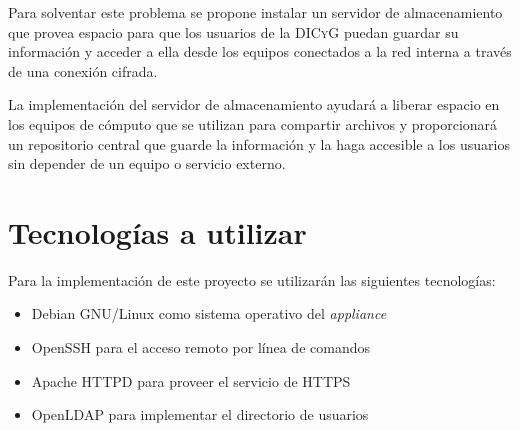 Para solventar este problema se propone instalar un servidor de almacenamiento que provea espacio para que los usuarios de la \textsc{DICyG} puedan guardar su informaci\'{o}n y acceder a ella desde los equipos conectados a la red interna a trav\'{e}s de una conexi\'{o}n cifrada.

La implementaci\'{o}n del servidor de almacenamiento ayudar\'{a} a liberar espacio en los equipos de c\'{o}mputo que se utilizan para compartir archivos y proporcionar\'{a} un repositorio central que guarde la informaci\'{o}n y la haga accesible a los usuarios sin depender de un equipo o servicio externo.


    \section {Tecnolog\'{i}as a utilizar}

Para la implementaci\'{o}n de este proyecto se utilizar\'{a}n las siguientes tecnolog\'{i}as:

\begin{itemize}
  \item Debian GNU/Linux como sistema operativo del \textit{appliance}
  \item OpenSSH para el acceso remoto por l\'{i}nea de comandos
  \item Apache \textsc{HTTPD} para proveer el servicio de \textsc{\gls{HTTPS}}
  \item \textup{OpenLDAP} para implementar el directorio de usuarios
\end{itemize}

